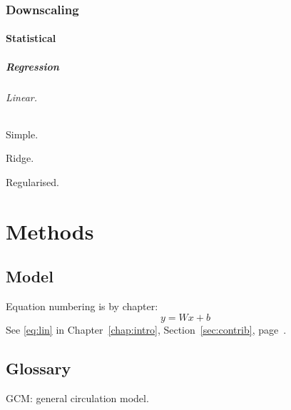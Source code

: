 \documentclass[12pt,oneside]{book}
\begin{document}
\section{Downscaling}
\subsection{Statistical}
\subsubsection{Regression}
\paragraph{Linear.} Simple.
\subparagraph{Ridge.} Regularised.

\part{Methods}
\chapter{Model}
Equation numbering is by chapter:
\begin{equation}
  y = Wx + b \label{eq:lin}
\end{equation}
See \eqref{eq:lin} in Chapter~\ref{chap:intro}, Section~\ref{sec:contrib}, page~\pageref{sec:contrib}.

\backmatter
\chapter{Glossary}
GCM: general circulation model.
\end{document}
